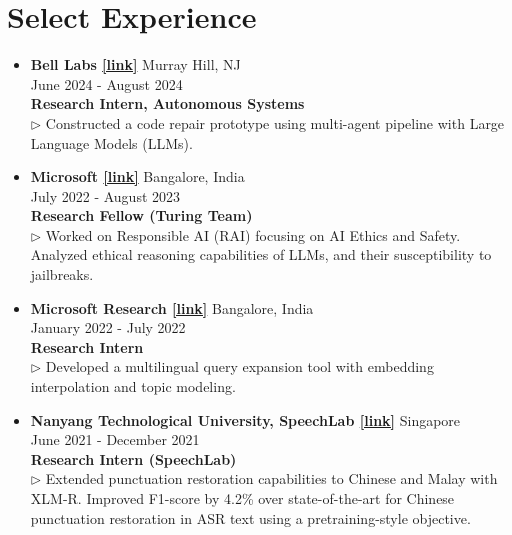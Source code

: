 \documentclass[11pt,letterpaper]{article}
\begin{document}
\section*{Select Experience}
\begin{itemize}[leftmargin=*,label={},itemsep=4pt]
    \item \textbf{Bell Labs  \href{https://www.bell-labs.com/}{[link]}} \hfill Murray Hill, NJ\\
        \hfill June 2024 - August 2024\\
        \textbf{\textit{} Research Intern, Autonomous Systems}\\
        $\triangleright$ Constructed a code repair prototype using multi-agent pipeline with Large Language Models (LLMs).\\
    \item \textbf{Microsoft  \href{https://www.microsoft.com/en-in/research/theme/artificial-intelligence/}{[link]}} \hfill Bangalore, India\\
        \hfill July 2022 - August 2023\\
        \textbf{\textit{} Research Fellow (Turing Team)}\\
        $\triangleright$ Worked on Responsible AI (RAI) focusing on AI Ethics and Safety. Analyzed ethical reasoning capabilities of LLMs, and their susceptibility to jailbreaks.\\
    \item \textbf{Microsoft Research  \href{https://www.microsoft.com/en-us/research/}{[link]}} \hfill Bangalore, India\\
        \hfill January 2022 - July 2022\\
        \textbf{\textit{} Research Intern}\\
        $\triangleright$ Developed a multilingual query expansion tool with embedding interpolation and topic modeling.\\
    \item \textbf{Nanyang Technological University, SpeechLab  \href{https://www.ntu.edu.sg/speechlab}{[link]}} \hfill Singapore\\
        \hfill June 2021 - December 2021\\
        \textbf{\textit{} Research Intern (SpeechLab)}\\
        $\triangleright$ Extended punctuation restoration capabilities to Chinese and Malay with XLM-R. Improved F1-score by 4.2\% over state-of-the-art for Chinese punctuation restoration in ASR text using a pretraining-style objective.\\
\end{itemize}
\end{document}
